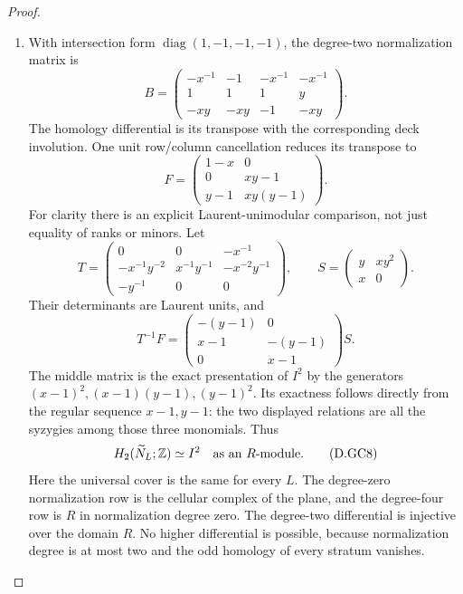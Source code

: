 \begin{proof}
\begin{enumerate}[label=\arabic*.,leftmargin=*]
\item With intersection form $\operatorname{diag}(1,-1,-1,-1)$,
the degree-two normalization matrix is
\[
 B=\begin{pmatrix}
 -x^{-1}&-1&-x^{-1}&-x^{-1}\\
 1&1&1&y\\
 -xy&-xy&-1&-xy
 \end{pmatrix}.                                         \tag{D.GC5}\label{maps:eq:D.GC5}
\]
The homology differential is its transpose with
the corresponding deck involution. One unit
row/column cancellation reduces its transpose to
\[
 F=\begin{pmatrix}
 1-x&0\\0&xy-1\\y-1&xy(y-1)
 \end{pmatrix}.                                         \tag{D.GC6}\label{maps:eq:D.GC6}
\]
For clarity there is an explicit Laurent-unimodular
comparison, not just equality of ranks or minors.
Let
\[
 T=\begin{pmatrix}
 0&0&-x^{-1}\\
 -x^{-1}y^{-2}&x^{-1}y^{-1}&-x^{-2}y^{-1}\\
 -y^{-1}&0&0
 \end{pmatrix},\qquad
 S=\begin{pmatrix}y&xy^2\\x&0\end{pmatrix}.
\]
Their determinants are Laurent units, and
\[
 T^{-1}F=
 \begin{pmatrix}-(y-1)&0\\x-1&-(y-1)\\0&x-1\end{pmatrix}S.
                                                        \tag{D.GC7}\label{maps:eq:D.GC7}
\]
The middle matrix is the exact presentation
of $I^2$ by the generators
$(x-1)^2,(x-1)(y-1),(y-1)^2$.
Its exactness follows directly from the regular
sequence $x-1,y-1$: the two displayed relations
are all the syzygies among those three monomials.
Thus
\[
                H_2(\widetilde N_L;\mathbb Z)\simeq I^2
                         \quad\hbox{as an }R\hbox{-module}.
                                                        \tag{D.GC8}\label{maps:eq:D.GC8}
\]
Here the universal cover is the same for every $L$.
The degree-zero normalization row is the cellular
complex of the plane, and the degree-four row is
$R$ in normalization degree zero. The degree-two
differential is injective over the domain $R$.
No higher differential is possible, because
normalization degree is at most two and the odd
homology of every stratum vanishes.


\end{enumerate}
\end{proof}
